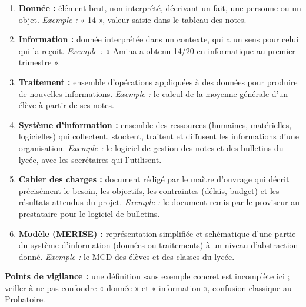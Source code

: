 \documentclass[11pt]{article}
\begin{document}
\begin{corrige}
\begin{enumerate}
  \item \textbf{Donnée :} élément brut, non interprété, décrivant un fait, une personne ou un objet. \emph{Exemple :} « 14 », valeur saisie dans le tableau des notes.
  \item \textbf{Information :} donnée interprétée dans un contexte, qui a un sens pour celui qui la reçoit. \emph{Exemple :} « Amina a obtenu 14/20 en informatique au premier trimestre ».
  \item \textbf{Traitement :} ensemble d'opérations appliquées à des données pour produire de nouvelles informations. \emph{Exemple :} le calcul de la moyenne générale d'un élève à partir de ses notes.
  \item \textbf{Système d'information :} ensemble des ressources (humaines, matérielles, logicielles) qui collectent, stockent, traitent et diffusent les informations d'une organisation. \emph{Exemple :} le logiciel de gestion des notes et des bulletins du lycée, avec les secrétaires qui l'utilisent.
  \item \textbf{Cahier des charges :} document rédigé par le maître d'ouvrage qui décrit précisément le besoin, les objectifs, les contraintes (délais, budget) et les résultats attendus du projet. \emph{Exemple :} le document remis par le proviseur au prestataire pour le logiciel de bulletins.
  \item \textbf{Modèle (MERISE) :} représentation simplifiée et schématique d'une partie du système d'information (données ou traitements) à un niveau d'abstraction donné. \emph{Exemple :} le MCD des élèves et des classes du lycée.
\end{enumerate}
\textbf{Points de vigilance :} une définition sans exemple concret est incomplète ici ; veiller à ne pas confondre « donnée » et « information », confusion classique au Probatoire.
\end{corrige}
\end{document}
